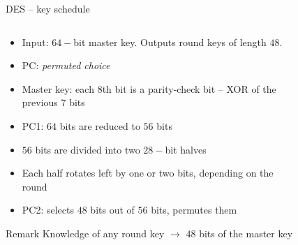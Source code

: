 \begin{frame}{DES -- key schedule}
\begin{columns}[T] %
\begin{column}{.6\textwidth}
\begin{itemize}
        \item Input: $64-$bit master key. Outputs round keys of length $48$.
        \item PC: \textit{permuted choice}
        \item Master key: each $8$th bit is a parity-check bit -- XOR of the previous $7$ bits
        \item PC1: $64$ bits are reduced to $56$ bits
        \item $56$ bits are divided into two $28-$bit halves
        \item Each half rotates left by one or two bits, depending on the round
        \item PC2: selects $48$ bits out of $56$ bits, permutes them
    \end{itemize}
\begin{alertblock}{Remark}
Knowledge of any round key $\to$ $48$ bits of the master key
\end{alertblock}
\end{column}%
\hfill%
\begin{column}{.5\textwidth}
\begin{figure}
    \centering

\end{figure}
\end{column}
\end{columns}
\end{frame}
